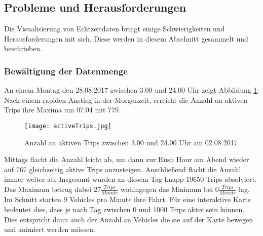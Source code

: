  
\subsection{Probleme und Herausforderungen}
\label{sub:probleme_und_herausforderungen}

  Die Visualisierung von Echtzeitdaten bringt einige Schwierigkeiten und Herausforderungen mit sich. Diese werden in diesem Abschnitt gesammelt und beschrieben.

  \subsubsection{Bewältigung der Datenmenge}
  \label{ssub:bewältigung_der_datenmenge}
    An einem Montag den 28.08.2017 zwischen 3.00 und 24.00 Uhr zeigt Abbildung \ref{fig:activeTrips}: Nach einem rapiden Anstieg in der Morgenzeit, erreicht die Anzahl an aktiven Trips ihre Maxima um 07.04 mit 779. 

    \begin{figure}[ht]
      \begin{center}
        \texttt{[image: activeTrips.jpg]}
        \caption{Anzahl an aktiven Trips zwischen 3.00 und 24.00 Uhr am 02.08.2017}
        \label{fig:activeTrips}
      \end{center}
    \end{figure}

    Mittags flacht die Anzahl leicht ab, um dann zur Rush Hour am Abend wieder auf 767 gleichzeitig aktive Trips anzusteigen. Anschließend flacht die Anzahl immer weiter ab. Insgesamt wurden an diesem Tag knapp 19650 Trips absolviert. Das Maximum betrug dabei $27 \frac{Trips}{Minute}$ wohingegen das Minimum bei $0 \frac{Trips}{Minute}$ lag. Im Schnitt starten 9 Vehicles pro Minute ihre Fahrt. Für eine interaktive Karte bedeutet dies, dass je nach Tag zwischen 0 und 1000 Trips aktiv sein können. Dies entspricht dann auch der Anzahl an Vehicles die sie auf der Karte bewegen und animiert werden müssen. 

